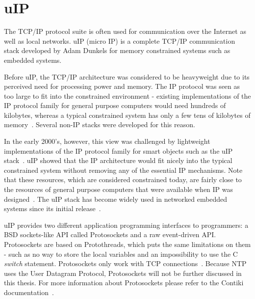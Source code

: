 
\section{uIP}\label{sec:contiki-uip}
The TCP/IP protocol suite is often used for communication over the Internet as well as local networks.
uIP (micro IP) is a complete TCP/IP communication stack developed by Adam Dunkels
for memory constrained systems such as embedded systems.

Before uIP, the TCP/IP architecture was considered to be heavyweight
due to its perceived need for processing power and memory.
The IP protocol was seen as too large to fit into the constrained environment -
existing implementations of the IP protocol family for general purpose computers would need hundreds
of kilobytes, whereas a typical constrained system has only a few tens of kilobytes of memory~\cite{interconnecting}.
Several non-IP stacks were developed for this reason.

In the early 2000's, however, this view was challenged by lightweight implementations of the IP
protocol family for smart objects such as the uIP stack~\cite{interconnecting}.
uIP showed that the IP architecture would fit nicely into the typical constrained system
without removing any of the essential IP mechanisms.
Note that these resources, which are considered constrained today, are fairly close to the
resources of general purpose computers that were available when IP was designed~\cite{interconnecting}.
The uIP stack has become widely used in networked embedded systems
since its initial release~\cite{interconnecting, thesis-programming}.

uIP provides two different application programming interfaces to programmers:
a BSD sockets-like API called Protosockets and a raw event-driven API.
Protosockets are based on Protothreads, which puts the same limitations on them - such as
no way to store the local variables and an impossibility to use the C {\it switch} statement.
Protosockets only work with TCP connections~\cite{contiki-docs}.
Because NTP uses the User Datagram Protocol, Protosockets will not be further
discussed in this thesis. For more information about Protosockets
please refer to the Contiki documentation~\cite{contiki-docs}.

